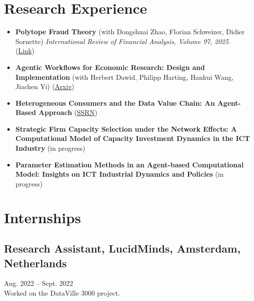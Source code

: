\documentclass[11pt,a4paper]{article}
\begin{document}
\section*{Research Experience}
\begin{itemize}[noitemsep]
  \item \textbf{Polytope Fraud Theory} (with Dongshuai Zhao, Florian Schweizer, Didier Sornette) \textit{International Review of Financial Analysis, Volume 97, 2025.} (\href{https://www.sciencedirect.com/science/article/pii/S1057521924006665?via%3Dihub}{Link})
  \vspace{0.5em}
  
  \item \textbf{Agentic Workflows for Economic Research: Design and Implementation} (with Herbert Dawid, Philipp Harting, Hankui Wang, Jiachen Yi) (\href{https://arxiv.org/abs/2504.09736}{Arxiv})
  \vspace{0.5em}
  
    \item \textbf{Heterogeneous Consumers and the Data Value Chain: An Agent-Based Approach} (\href{https://papers.ssrn.com/sol3/papers.cfm?abstract_id=5235196}{SSRN})
    \vspace{0.5em}
    
      \item \textbf{Strategic Firm Capacity Selection under the Network Effects: A Computational Model of Capacity Investment Dynamics in the ICT Industry} (in progress)
      \vspace{0.5em}
      
      \item \textbf{Parameter Estimation Methods in an Agent-based Computational Model: Insights on ICT Industrial Dynamics and Policies} (in progress)
\end{itemize}

\section*{Internships}
\subsection*{Research Assistant, LucidMinds, Amsterdam, Netherlands}
Aug. 2022 -- Sept. 2022 \\
Worked on the DataVille 3000 project.
\end{document}
